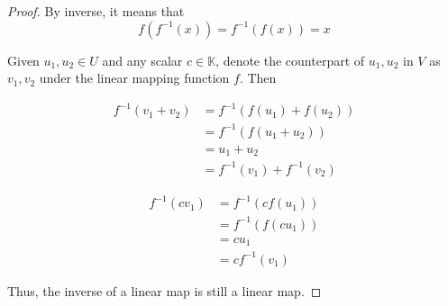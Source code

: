\documentclass[paper=a4, fontsize=11pt]{scrartcl} %
\numberwithin{equation}{section} %
\numberwithin{figure}{section} %
\numberwithin{table}{section} %
\begin{document}
\begin{enumerate}
\begin{proof}
			By inverse, it means that
			\begin{equation}
				f(f^{-1}(x)) = f^{-1}(f(x)) = x
			\end{equation}
			
			Given $u_1, u_2 \in U$ and any scalar $c \in \mathbb{K}$, denote the counterpart of $u_1, u_2$ in $V$ as $v_1, v_2$ under the linear mapping function $f$. Then
			
			\begin{equation}
				\begin{aligned}
					f^{-1}(v_1 + v_2) & = f^{-1}(f(u_1) + f(u_2)) \\
									  & = f^{-1}(f(u_1 + u_2)) \\
									  & = u_1 + u_2 \\
									  & = f^{-1}(v_1) + f^{-1}(v_2)
				\end{aligned}
			\end{equation}
			
			\begin{equation}
				\begin{aligned}
					f^{-1}(c v_1) & = f^{-1}(c f(u_1)) \\
							      & = f^{-1}(f(c u_1)) \\
								  & = c u_1 \\
								  & = c f^{-1}(v_1)
				\end{aligned}
			\end{equation}
			
			Thus, the inverse of a linear map is still a linear map.
		\end{proof}
\end{enumerate}

\end{document}
